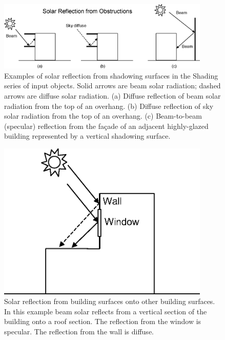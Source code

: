 \begin{figure}[hbtp] %
\centering
\includegraphics[width=0.9\textwidth, height=0.9\textheight, keepaspectratio=true]{media/image670.png}
\caption{Examples of solar reflection from shadowing surfaces in the Shading series of input objects. Solid arrows are beam solar radiation; dashed arrows are diffuse solar radiation. (a) Diffuse reflection of beam solar radiation from the top of an overhang. (b) Diffuse reflection of sky solar radiation from the top of an overhang. (c) Beam-to-beam (specular) reflection from the façade of an adjacent highly-glazed building represented by a vertical shadowing surface. \protect \label{fig:examples-of-solar-reflection-from-shadowing}}
\end{figure}

\begin{figure}[hbtp] %
\centering
\includegraphics[width=0.9\textwidth, height=0.9\textheight, keepaspectratio=true]{media/image671.png}
\caption{Solar reflection from building surfaces onto other building surfaces. In this example beam solar reflects from a vertical section of the building onto a roof section. The reflection from the window is specular. The reflection from the wall is diffuse. \protect \label{fig:solar-reflection-from-building-surfaces-onto}}
\end{figure}

